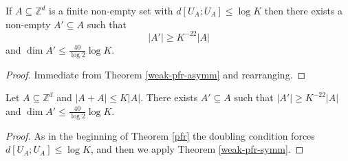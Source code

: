 \begin{theorem}\label{weak-pfr-symm}\leanok
If $A\subseteq \mathbb{Z}^d$ is a finite non-empty set with $d[U_A;U_A]\leq \log K$ then there exists a non-empty $A'\subseteq A$ such that
\[\lvert A'\rvert\geq K^{-22}\lvert A\rvert\]
and $\dim A'\leq \frac{40}{\log 2} \log K$.
\end{theorem}
\begin{proof}
\leanok
Immediate from Theorem \ref{weak-pfr-asymm} and rearranging.
\end{proof}

\begin{theorem}\label{weak-pfr-int}\leanok
Let $A\subseteq \mathbb{Z}^d$ and $\lvert A+A\rvert\leq K\lvert A\rvert$. There exists $A'\subseteq A$ such that $\lvert A'\rvert \geq K^{-22}\lvert A\rvert$ and $\dim A' \leq \frac{40}{\log 2}\log K$.
\end{theorem}
\begin{proof}\leanok
{}
As in the beginning of Theorem \ref{pfr} the doubling condition forces $d[U_A;U_A]\leq \log K$, and then we apply Theorem \ref{weak-pfr-symm}.
\end{proof}

